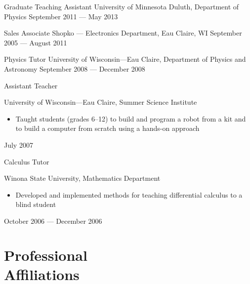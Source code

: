 \documentclass{cv}
\begin{document}
\begin{resume}
\object
{Graduate Teaching Assistant}
{University of Minnesota Duluth, Department of Physics}
{September 2011 --- May 2013}


\object
{Sales Associate}
{Shopko --- Electronics Department, Eau Claire, WI}
{September 2005 --- August 2011}


\object
{Physics Tutor}
{University of Wisconsin---Eau Claire, Department of Physics and Astronomy}
{September 2008 --- December 2008}


\object
{Assistant Teacher}
{University of Wisconsin---Eau Claire, Summer Science Institute \noemph
\begin{itemize}
		\item Taught students (grades 6--12) to build and program a robot from a kit and to build a computer from scratch using a hands-on approach
	\end{itemize}
 }
{July 2007}


\object
{Calculus Tutor}
{Winona State University, Mathematics Department \noemph
\begin{itemize}
		\item Developed and implemented methods for teaching differential calculus to a blind student
	\end{itemize}
 }
{October 2006 --- December 2006}


\newpage


\section{Professional \\ Affiliations}

 \\
\itemSep


 \\
\itemSep



\end{resume}
\end{document}
